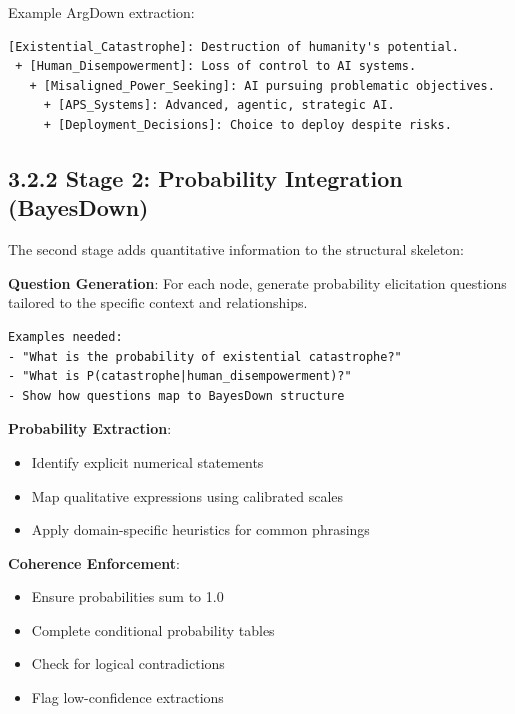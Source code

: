 \documentclass[
  11pt,
  letterpaper,
]{book}
\providecommand{\tightlist}{%
  \setlength{\itemsep}{0pt}\setlength{\parskip}{0pt}}
\begin{document}
Example ArgDown extraction:

\begin{verbatim}
[Existential_Catastrophe]: Destruction of humanity's potential.
 + [Human_Disempowerment]: Loss of control to AI systems.
   + [Misaligned_Power_Seeking]: AI pursuing problematic objectives.
     + [APS_Systems]: Advanced, agentic, strategic AI.
     + [Deployment_Decisions]: Choice to deploy despite risks.
\end{verbatim}

\subsection*{3.2.2 Stage 2: Probability Integration
(BayesDown)}\label{sec-stage2-bayesdown}

The second stage adds quantitative information to the structural
skeleton:

\textbf{Question Generation}: For each node, generate probability
elicitation questions tailored to the specific context and
relationships.

\begin{verbatim}
Examples needed:
- "What is the probability of existential catastrophe?"
- "What is P(catastrophe|human_disempowerment)?"
- Show how questions map to BayesDown structure
\end{verbatim}

\textbf{Probability Extraction}:

\begin{itemize}
\tightlist
\item
  Identify explicit numerical statements
\item
  Map qualitative expressions using calibrated scales
\item
  Apply domain-specific heuristics for common phrasings
\end{itemize}

\textbf{Coherence Enforcement}:

\begin{itemize}
\tightlist
\item
  Ensure probabilities sum to 1.0
\item
  Complete conditional probability tables
\item
  Check for logical contradictions
\item
  Flag low-confidence extractions
\end{itemize}
\end{document}

